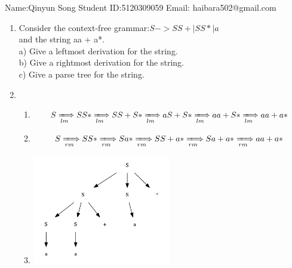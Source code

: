 \documentclass[12pt,a4paper]{article}
\makeatletter
\newtheorem*{solution}{Solution}
\renewenvironment{solution}[1][Solution] {\par\pushQED{\qed}\normalfont\topsep6\p@\@plus6\p@\relax\trivlist\item[\hskip\labelsep\bfseries#1\@addpunct{.}]\ignorespaces}{\popQED\endtrivlist\@endpefalse} \makeatother
\makeatother
\begin{document}
\noindent

\noindent{}
\begin{center}
\footnotesize{\color{blue} \quad Name:Qinyun Song  \quad Student ID:5120309059 \quad Email: haibara502@gmail.com}
\end{center}
\begin{enumerate}
\item Consider the context-free grammar:$S -> S S + | S S * | a$\\
and the string aa + a*. \\
a) Give a leftmost derivation for the string. \\
b) Give a rightmost derivation for the string. \\
c) Give a parse tree for the string. \\

\begin{solution}
	$   $
	\begin{enumerate}
		\item 
		\begin{displaymath}
			S \xLongrightarrow[lm]{} SS* \xLongrightarrow[lm]{} SS+S* \xLongrightarrow[lm]{} aS+S* \xLongrightarrow[lm]{} aa+S* \xLongrightarrow[lm]{} aa+a*
		\end{displaymath}
		
		\item
		\begin{displaymath}
			S \xLongrightarrow[rm]{} SS* \xLongrightarrow[rm]{} Sa* \xLongrightarrow[rm]{} SS+a* \xLongrightarrow[rm]{} Sa+a* \xLongrightarrow[rm]{} aa+a*
		\end{displaymath}
		
		\item
		\includegraphics[width=0.5\textwidth]{parseTree.png}
	\end{enumerate}
\end{solution}


\end{enumerate}
\end{document}
